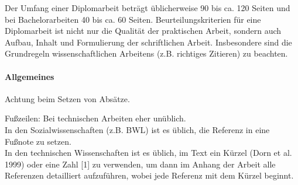 Der Umfang einer Diplomarbeit beträgt üblicherweise 90 bis ca. 120 Seiten und bei Bachelorarbeiten 40 bis ca. 60 Seiten. Beurteilungskriterien für eine Diplomarbeit ist nicht nur die Qualität der praktischen Arbeit, sondern auch Aufbau, Inhalt und Formulierung der schriftlichen Arbeit. Insbesondere sind die Grundregeln wissenschaftlichen Arbeitens (z.B. richtiges Zitieren) zu beachten.

\paragraph{Allgemeines}
Achtung beim Setzen von Absätze.

Fußzeilen: Bei technischen Arbeiten eher unüblich. \\
In den Sozialwissenschaften (z.B. BWL) ist es üblich, die Referenz in eine Fußnote zu setzen.
\\
In den technischen Wissenschaften ist es üblich, im Text ein Kürzel (Dorn et al. 1999) oder eine Zahl [1] zu verwenden, um dann im Anhang der Arbeit alle Referenzen detailliert aufzuführen, wobei jede Referenz mit dem Kürzel beginnt.

